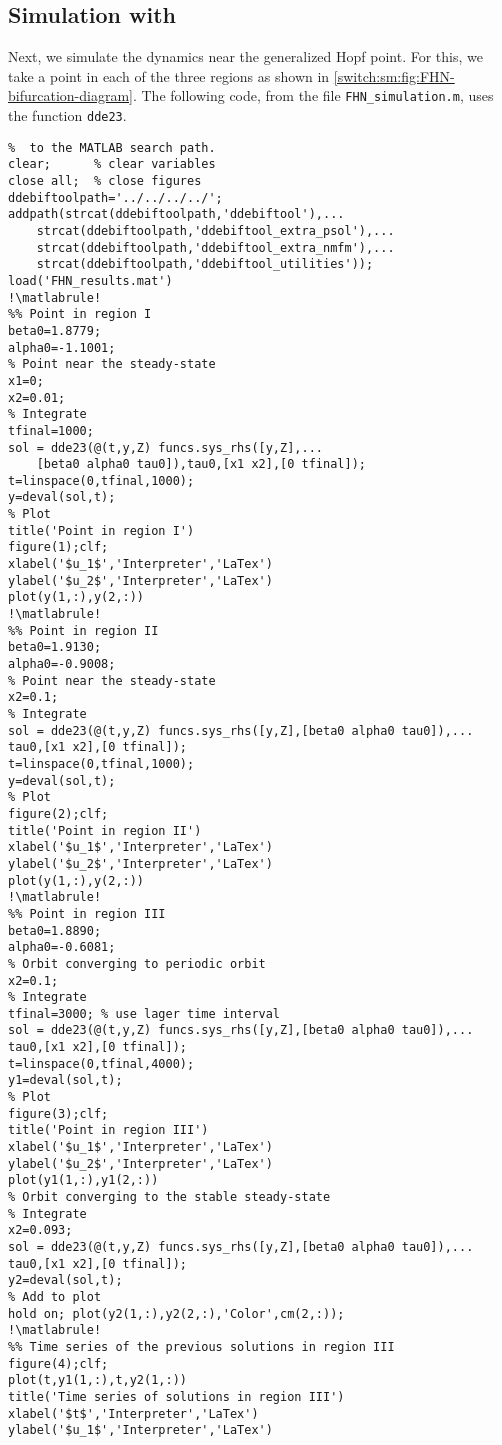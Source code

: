 \subsection{Simulation with \MATLAB}
\label{switch:SM:sec:GH:simulation}
Next, we simulate the dynamics near the generalized Hopf point. For this, we take a point in each of the three regions as shown in \cref{switch:sm:fig:FHN-bifurcation-diagram}. The following code, from the file \lstinline|FHN_simulation.m|, uses the \MATLAB function \lstinline|dde23|.
\begin{lstlisting}[style=customMatlab,escapechar=!]
%% Clean workspace and add DDE-BifTool scripts
%  to the MATLAB search path.
clear;      % clear variables
close all;  % close figures
ddebiftoolpath='../../../../';
addpath(strcat(ddebiftoolpath,'ddebiftool'),...
    strcat(ddebiftoolpath,'ddebiftool_extra_psol'),...
    strcat(ddebiftoolpath,'ddebiftool_extra_nmfm'),...
    strcat(ddebiftoolpath,'ddebiftool_utilities'));
load('FHN_results.mat')
!\matlabrule!
%% Point in region I
beta0=1.8779;
alpha0=-1.1001;
% Point near the steady-state
x1=0;
x2=0.01;
% Integrate
tfinal=1000;
sol = dde23(@(t,y,Z) funcs.sys_rhs([y,Z],...
	[beta0 alpha0 tau0]),tau0,[x1 x2],[0 tfinal]);
t=linspace(0,tfinal,1000);
y=deval(sol,t);
% Plot
title('Point in region I')
figure(1);clf;
xlabel('$u_1$','Interpreter','LaTex')
ylabel('$u_2$','Interpreter','LaTex')
plot(y(1,:),y(2,:))
!\matlabrule!
%% Point in region II
beta0=1.9130;
alpha0=-0.9008;
% Point near the steady-state
x2=0.1;
% Integrate
sol = dde23(@(t,y,Z) funcs.sys_rhs([y,Z],[beta0 alpha0 tau0]),...
tau0,[x1 x2],[0 tfinal]);
t=linspace(0,tfinal,1000);
y=deval(sol,t);
% Plot
figure(2);clf;
title('Point in region II')
xlabel('$u_1$','Interpreter','LaTex')
ylabel('$u_2$','Interpreter','LaTex')
plot(y(1,:),y(2,:))
!\matlabrule!
%% Point in region III
beta0=1.8890;
alpha0=-0.6081;
% Orbit converging to periodic orbit
x2=0.1;
% Integrate
tfinal=3000; % use lager time interval
sol = dde23(@(t,y,Z) funcs.sys_rhs([y,Z],[beta0 alpha0 tau0]),...
tau0,[x1 x2],[0 tfinal]);
t=linspace(0,tfinal,4000);
y1=deval(sol,t);
% Plot
figure(3);clf;
title('Point in region III')
xlabel('$u_1$','Interpreter','LaTex')
ylabel('$u_2$','Interpreter','LaTex')
plot(y1(1,:),y1(2,:))
% Orbit converging to the stable steady-state
% Integrate
x2=0.093;
sol = dde23(@(t,y,Z) funcs.sys_rhs([y,Z],[beta0 alpha0 tau0]),...
tau0,[x1 x2],[0 tfinal]);
y2=deval(sol,t);
% Add to plot
hold on; plot(y2(1,:),y2(2,:),'Color',cm(2,:));
!\matlabrule!
%% Time series of the previous solutions in region III
figure(4);clf;
plot(t,y1(1,:),t,y2(1,:))
title('Time series of solutions in region III')
xlabel('$t$','Interpreter','LaTex')
ylabel('$u_1$','Interpreter','LaTex')
\end{lstlisting}
